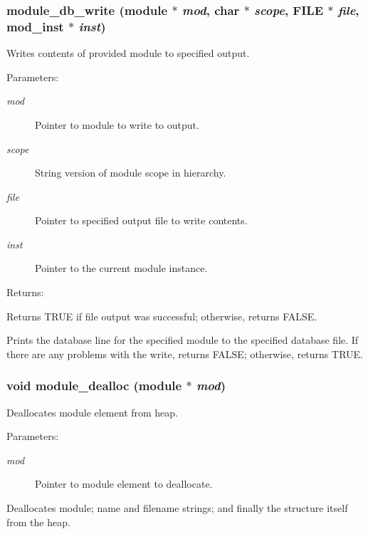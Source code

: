 \subsubsection{ module\_\-db\_\-write ({\bf module} $\ast$ {\em mod}, char $\ast$ {\em scope}, FILE $\ast$ {\em file}, {\bf mod\_\-inst} $\ast$ {\em inst})}\label{module_8c_a4}


Writes contents of provided module to specified output.

\begin{Desc}
\item[Parameters: ]\par
\begin{description}
\item[{\em 
mod}]Pointer to module to write to output. \item[{\em 
scope}]String version of module scope in hierarchy. \item[{\em 
file}]Pointer to specified output file to write contents. \item[{\em 
inst}]Pointer to the current module instance.\end{description}
\end{Desc}
\begin{Desc}
\item[Returns: ]\par
Returns TRUE if file output was successful; otherwise, returns FALSE.\end{Desc}
Prints the database line for the specified module to the specified database file. If there are any problems with the write, returns FALSE; otherwise, returns TRUE. 
\subsubsection{\setlength{\rightskip}{0pt plus 5cm}void module\_\-dealloc ({\bf module} $\ast$ {\em mod})}\label{module_8c_a10}


Deallocates module element from heap.

\begin{Desc}
\item[Parameters: ]\par
\begin{description}
\item[{\em 
mod}]Pointer to module element to deallocate.\end{description}
\end{Desc}
Deallocates module; name and filename strings; and finally the structure itself from the heap. 
